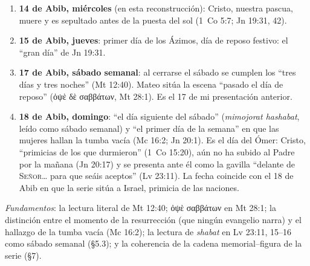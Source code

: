 \documentclass[11pt,letterpaper]{article}
\newcommand{\grc}[1]{\foreignlanguage{ancientgreek}{#1}}
\newcommand{\SENOR}{\textsc{Señor}}
\begin{document}
\begin{tcolorbox}[enhanced,unbreakable,colback=papiro,colframe=tierraroja,boxrule=1pt,arc=3pt,fonttitle=\bfseries\small,coltitle=papiro,colbacktitle=tierraroja,fontupper=\small,title={Lectura de la serie: la cronología adoptada}]
\begin{enumerate}\setlength{\itemsep}{1pt}
\item \textbf{14 de Abib, miércoles} (en esta reconstrucción): Cristo, nuestra pascua, muere y es sepultado antes de la puesta del sol (1~Co 5:7; Jn 19:31, 42).
\item \textbf{15 de Abib, jueves}: primer día de los Ázimos, día de reposo festivo: el ``gran día'' de Jn 19:31.
\item \textbf{17 de Abib, sábado semanal}: al cerrarse el sábado se cumplen los ``tres días y tres noches'' (Mt 12:40). Mateo sitúa la escena ``pasado el día de reposo'' (\grc{ὀψὲ δὲ σαββάτων}, Mt 28:1). Es el 17 de mi presentación anterior.
\item \textbf{18 de Abib, domingo}: ``el día siguiente del sábado'' (\emph{mimojorat hashabat}, leído como sábado semanal) y ``el primer día de la semana'' en que las mujeres hallan la tumba vacía (Mc 16:2; Jn 20:1). Es el día del Ómer: Cristo, ``primicias de los que durmieron'' (1~Co 15:20), aún no ha subido al Padre por la mañana (Jn 20:17) y se presenta ante él como la gavilla ``delante de \SENOR{}\ldots{} para que seáis aceptos'' (Lv 23:11). La fecha coincide con el 18 de Abib en que la serie sitúa a Israel, primicia de las naciones.
\end{enumerate}
\emph{Fundamentos}: la lectura literal de Mt 12:40; \grc{ὀψὲ σαββάτων} en Mt 28:1; la distinción entre el momento de la resurrección (que ningún evangelio narra) y el hallazgo de la tumba vacía (Mc 16:2); la lectura de \emph{shabat} en Lv 23:11, 15--16 como sábado semanal (§5.3); y la coherencia de la cadena memorial--figura de la serie (§7).
\end{tcolorbox}
\end{document}

